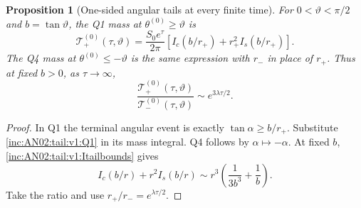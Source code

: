 \documentclass[11pt]{article}
\numberwithin{equation}{section}
\newtheorem{proposition}[theorem]{Proposition}
\theoremstyle{remark}\newtheorem{remark}[theorem]{Remark}
\newcommand{\1}{\mathbf 1}
\begin{document}
\begin{proposition}[One-sided angular tails at every finite time]
\label{inc:AN02:tail:v1:angulartail}
For $0<\vartheta<\pi/2$ and $b=\tan\vartheta$, the Q1 mass at
$\theta^{(0)}\ge\vartheta$ is
\begin{equation}\label{inc:AN02:tail:v1:tailpush}
 \mathcal T_+^{(0)}(\tau,\vartheta)
 =\frac{S_0e^\tau}{2\pi}
 \left[I_c(b/r_+)+r_+^2I_s(b/r_+)\right].
\end{equation}
The Q4 mass at $\theta^{(0)}\le-\vartheta$ is the same expression with
$r_-$ in place of $r_+$. Thus at fixed $b>0$, as $\tau\to\infty$,
\begin{equation}\label{inc:AN02:tail:v1:asymmetricratio}
 \frac{\mathcal T_+^{(0)}(\tau,\vartheta)}
 {\mathcal T_-^{(0)}(\tau,\vartheta)}
 \sim e^{3\lambda\tau/2}.
\end{equation}
\end{proposition}
\begin{proof}
In Q1 the terminal angular event is exactly
$\tan\alpha\ge b/r_+$. Substitute \eqref{inc:AN02:tail:v1:Q1} in its
mass integral. Q4 follows by $\alpha\mapsto-\alpha$.
At fixed $b$, \eqref{inc:AN02:tail:v1:Itailbounds} gives
\[
 I_c(b/r)+r^2I_s(b/r)\sim r^3\left(\frac1{3b^3}+\frac1b\right).
\]
Take the ratio and use $r_+/r_-=e^{\lambda\tau/2}$.
\end{proof}
\end{document}
